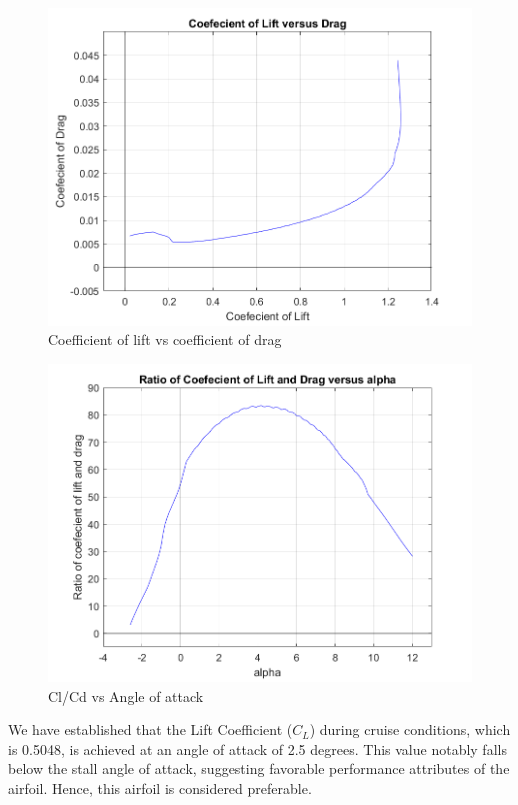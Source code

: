 \documentclass[12 pt]{article}
\begin{document}
\begin{figure}[H]
    \centering
    \includegraphics[scale = 0.8]{Codes/Week 6/Cl_Cd.png}
    \caption{Coefficient of lift vs coefficient of drag}
    \label{Coefficient of lift vs coefficient of drag}
\end{figure}

\begin{figure}[H]
    \centering
    \includegraphics[scale = 0.8]{Codes/Week 6/Cl_Cd_ratio.png}
    \caption{Cl/Cd vs Angle of attack}
    \label{Cl/Cd vs Angle of attack}
\end{figure}
\newpage

We have established that the Lift Coefficient ($C_L$) during cruise conditions, which is 0.5048, is achieved at an angle of attack of 2.5 degrees. This value notably falls below the stall angle of attack, suggesting favorable performance attributes of the airfoil. Hence, this airfoil is considered preferable.
\end{document}
